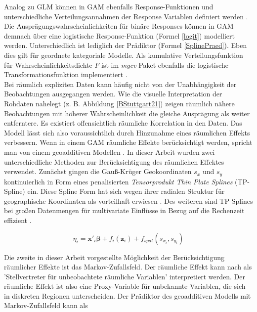 \documentclass{Vorlage}
\begin{document}
Analog zu GLM können in GAM ebenfalls Response-Funktionen und unterschiedliche Verteilungsannahmen der Response Variablen definiert werden \cite[p. 448]{fahrmeir2013regression}. Die Ausprägungswahrscheinlichkeiten für binäre Responses können in GAM demnach über eine logistische Response-Funktion (Formel \ref{logit}) modelliert werden. Unterschiedlich ist lediglich der Prädiktor (Formel \ref{SplinePraed}). Eben dies gilt für geordnete kategoriale Modelle. Als kumulative Verteilungsfunktion für Wahrscheinlichkeitsdichte $F$ ist im \textit{mgcv} Paket ebenfalls die logistische Transformationsfunktion implementiert \cite[p. 22]{wood2016}.\\
Bei räumlich expliziten Daten kann häufig nicht von der Unabhängigkeit der Beobachtungen ausgegangen werden. Wie die visuelle Interpretation der Rohdaten nahelegt (z. B. Abbildung \ref{BStuttgart21}) zeigen räumlich nähere Beobachtungen mit höherer Wahrscheinlichkeit die gleiche Ausprägung als weiter entferntere. Es existiert offensichtlich räumliche Korrelation in den Daten. Das Modell lässt sich also voraussichtlich durch Hinzunahme eines räumlichen Effekts verbessern. Wenn in einem GAM räumliche Effekte berücksichtigt werden, spricht man von einem geoadditiven Modellen \cite[p. 540]{fahrmeir2013regression}. In dieser Arbeit wurden zwei unterschiedliche Methoden zur Berücksichtigung des räumlichen Effektes verwendet. Zunächst gingen die Gauß-Krüger Geokoordinaten $s_x$ und $s_y$ kontinuierlich in Form eines penalisierten \textit{Tensorprodukt Thin Plate Splines} (TP-Spline) ein. Diese Spline Form hat sich wegen ihrer radialen Struktur für geographische Koordinaten als vorteilhaft erwiesen \cite[p. 354]{gu1993}. Des weiteren sind TP-Splines bei großen Datenmengen für multivariate Einflüsse in Bezug auf die Rechenzeit effizient \cite[p. 95 f.]{wood2003}.

\begin{equation}
\eta_{i} =\mathbf{x}'_i \boldsymbol{\beta}+f_{i}(\mathbf{z}_{i})+f_{spat}(s_{x_i},s_{y_i})
\end{equation}

Die zweite in dieser Arbeit vorgestellte Möglichkeit der Berücksichtigung räumlicher Effekte ist das Markov-Zufallsfeld. Der räumliche Effekt kann nach \cite[p. 541]{fahrmeir2013regression} als 'Stellvertreter für unbeobachtete räumliche Variablen' interpretiert werden. Der räumliche Effekt ist also eine Proxy-Variable für unbekannte Variablen, die sich in diskreten Regionen unterscheiden. Der Prädiktor des geoadditiven Modells mit Markov-Zufallsfeld kann als
\end{document}
